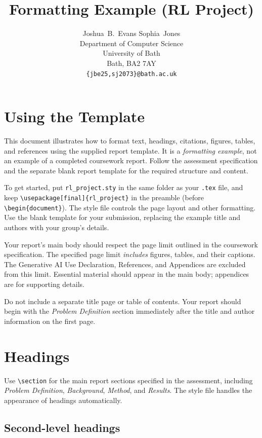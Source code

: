 \documentclass[letterpaper]{article}
\title{Formatting Example (RL Project)}
\author{
  Joshua~B.~Evans \qquad Sophia~Jones \\
  Department of Computer Science \\
  University of Bath \\
  Bath, BA2 7AY \\
  \texttt{\{jbe25,sj2073\}@bath.ac.uk}
}
\begin{document}
\maketitle

\section{Using the Template}

This document illustrates how to format text, headings, citations, figures, tables, and references using the supplied report template. It is a \emph{formatting example}, not an example of a completed coursework report. Follow the assessment specification and the separate blank report template for the required structure and content.

To get started, put \verb|rl_project.sty| in the same folder as your \verb|.tex| file, and keep \verb|\usepackage[final]{rl_project}| in the preamble (before \verb|\begin{document}|). The style file controls the page layout and other formatting. Use the blank template for your submission, replacing the example title and authors with your group's details.

Your report's main body should respect the page limit outlined in the coursework specification. The specified page limit \emph{includes} figures, tables, and their captions. The Generative AI Use Declaration, References, and Appendices are excluded from this limit. Essential material should appear in the main body; appendices are for supporting details.

Do not include a separate title page or table of contents. Your report should begin with the \emph{Problem Definition} section immediately after the title and author information on the first page.

\section{Headings}

Use \verb|\section| for the main report sections specified in the assessment, including \emph{Problem Definition}, \emph{Background}, \emph{Method}, and \emph{Results}. The style file handles the appearance of headings automatically.

\subsection{Second-level headings}
\end{document}
